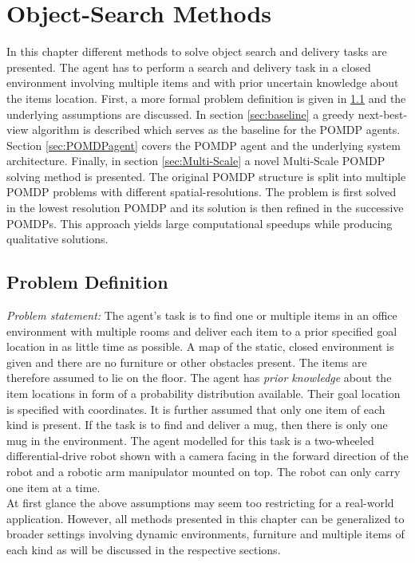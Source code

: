 \chapter{Object-Search Methods}
\label{sec:object_search}
In this chapter different methods to solve object search and delivery tasks are presented. The agent has to perform a search and delivery task in a closed environment involving multiple items and with prior uncertain knowledge about the items location. First, a more formal problem definition is given in \ref{sec:problemdef} and the underlying assumptions are discussed. In section \ref{sec:baseline} a greedy next-best-view algorithm is described which serves as the baseline for the POMDP agents. Section \ref{sec:POMDPagent} covers the POMDP agent and the underlying system architecture. Finally, in section \ref{sec:Multi-Scale} a novel Multi-Scale POMDP solving method is presented. The original POMDP structure is split into multiple POMDP problems with different spatial-resolutions. The problem is first solved in the lowest resolution POMDP and its solution is then refined in the successive POMDPs. This approach yields large computational speedups while producing qualitative solutions.  

\section{Problem Definition}\label{sec:problemdef}
\textit{Problem statement:} 
The agent's task is to find one or multiple items in an office environment with multiple rooms and deliver each item to a prior specified goal location in as little time as possible. A map of the static, closed environment is given and there are no furniture or other obstacles present. The items are therefore assumed to lie on the floor. The agent has \textit{prior knowledge} about the item locations in form of a probability distribution available. Their goal location is specified with coordinates. It is further assumed that only one item of each kind is present. If the task is to find and deliver a mug, then there is only one mug in the environment. The agent modelled for this task is a two-wheeled differential-drive robot shown with a camera facing in the forward direction of the robot and a robotic arm manipulator mounted on top. The robot can only carry one item at a time.\\

At first glance the above assumptions may seem too restricting for a real-world application. However, all methods presented in this chapter can be generalized to broader settings involving dynamic environments, furniture and multiple items of each kind as will be discussed in the respective sections.
